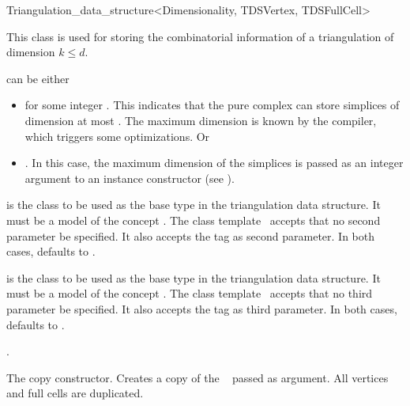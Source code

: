 \begin{ccRefClass}{Triangulation_data_structure<Dimensionality, TDSVertex, TDSFullCell>}

\ccDefinition 
This class is used for storing the combinatorial information of a triangulation
of dimension $k\leq d$.


\ccParameters

 can be either \begin{itemize}

\item \ccPureGlobalScope{} for some integer . This
indicates that the pure complex can store simplices of dimension at most
. The maximum dimension  is known by the compiler, which
triggers some optimizations. Or

\item \ccPureGlobalScope{}. In this case, the maximum
dimension of the simplices is passed as an integer argument to an instance
constructor (see ).\end{itemize}

 is the class to be used as the base  type in the
triangulation data structure. It must be a model of the concept
. The class template \ccRefName\ accepts that no
second parameter be specified. It also accepts the tag  as
second parameter. In both cases,  defaults to
.


 is the class to be used as the base  type in
the triangulation data structure. It must be a model of the concept
. The class template \ccRefName\ accepts that no
third parameter be specified. It also accepts the tag  as
third parameter. In both cases,  defaults to
.

\ccIsModel

.

\ccCreation
{}

{The copy constructor. Creates a copy of the \ccRefName\  passed as
    argument. All vertices and full cells are duplicated.}


\end{ccRefClass}
